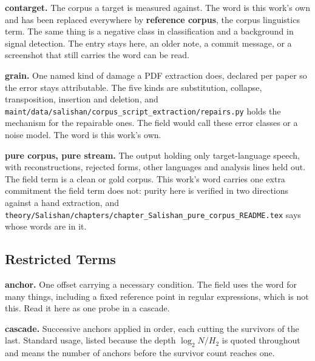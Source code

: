 \noindent\textbf{contarget.} The corpus a target is measured against. The word is this work's own and has been replaced everywhere by \textbf{reference corpus}, the corpus linguistics term. The same thing is a negative class in classification and a background in signal detection. The entry stays here, an older note, a commit message, or a screenshot that still carries the word can be read.

\noindent\textbf{grain.} One named kind of damage a PDF extraction does, declared per paper so the error stays attributable. The five kinds are substitution, collapse, transposition, insertion and deletion, and \texttt{maint/\allowbreak{}data/\allowbreak{}salishan/\allowbreak{}corpus\_\allowbreak{}script\_\allowbreak{}extraction/\allowbreak{}repairs.\allowbreak{}py} holds the mechanism for the repairable ones. The field would call these error classes or a noise model. The word is this work's own.

\noindent\textbf{pure corpus, pure stream.} The output holding only target-language speech, with reconstructions, rejected forms, other languages and analysis lines held out. The field term is a clean or gold corpus. This work's word carries one extra commitment the field term does not: purity here is verified in two directions against a hand extraction, and \texttt{theory/\allowbreak{}Salishan/\allowbreak{}chapters/\allowbreak{}chapter\_\allowbreak{}Salishan\_\allowbreak{}pure\_\allowbreak{}corpus\_\allowbreak{}README.\allowbreak{}tex} says whose words are in it.

\subsection{Restricted Terms}

\noindent\textbf{anchor.} One offset carrying a necessary condition. The field uses the word for many things, including a fixed reference point in regular expressions, which is not this. Read it here as one probe in a cascade.

\noindent\textbf{cascade.} Successive anchors applied in order, each cutting the survivors of the last. Standard usage, listed because the depth \(\log_2 N / H_2\) is quoted throughout and means the number of anchors before the survivor count reaches one.


